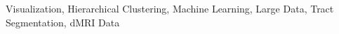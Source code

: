 \documentclass[runningheads,a4paper]{llncs}
\newcommand{\keywords}[1]{\par\addvspace\baselineskip
\noindent\keywordname\enspace\ignorespaces#1}
\begin{document}


\keywords{ Visualization, Hierarchical Clustering, Machine Learning, Large Data, Tract Segmentation, dMRI Data}





%





%



%
\end{document}
